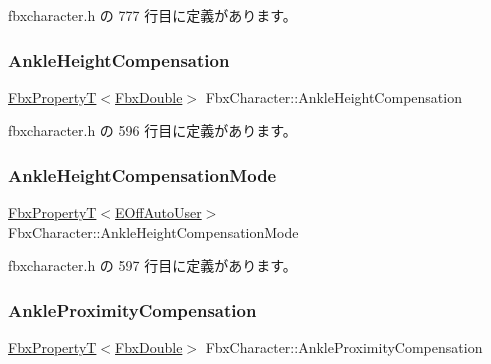  fbxcharacter.\+h の 777 行目に定義があります。

\mbox{\label{class_fbx_character_a06403d453ebdc44a9ac43d4015984746}} 
\subsubsection{\texorpdfstring{Ankle\+Height\+Compensation}{AnkleHeightCompensation}}
{\footnotesize\ttfamily \hyperlink{class_fbx_property_t}{Fbx\+PropertyT}$<$\hyperlink{fbxtypes_8h_a171e72a1c46fc15c1a6c9c31948c1c5b}{Fbx\+Double}$>$ Fbx\+Character\+::\+Ankle\+Height\+Compensation}



 fbxcharacter.\+h の 596 行目に定義があります。

\mbox{\label{class_fbx_character_a8c6ef4f12810113156cfbe6c580c0386}} 
\subsubsection{\texorpdfstring{Ankle\+Height\+Compensation\+Mode}{AnkleHeightCompensationMode}}
{\footnotesize\ttfamily \hyperlink{class_fbx_property_t}{Fbx\+PropertyT}$<$\hyperlink{class_fbx_character_ab698a180e6f900ba8317257749c2ecce}{E\+Off\+Auto\+User}$>$ Fbx\+Character\+::\+Ankle\+Height\+Compensation\+Mode}



 fbxcharacter.\+h の 597 行目に定義があります。

\mbox{\label{class_fbx_character_aa1d39ce9313df0fe4b472c446e66225c}} 
\subsubsection{\texorpdfstring{Ankle\+Proximity\+Compensation}{AnkleProximityCompensation}}
{\footnotesize\ttfamily \hyperlink{class_fbx_property_t}{Fbx\+PropertyT}$<$\hyperlink{fbxtypes_8h_a171e72a1c46fc15c1a6c9c31948c1c5b}{Fbx\+Double}$>$ Fbx\+Character\+::\+Ankle\+Proximity\+Compensation}



